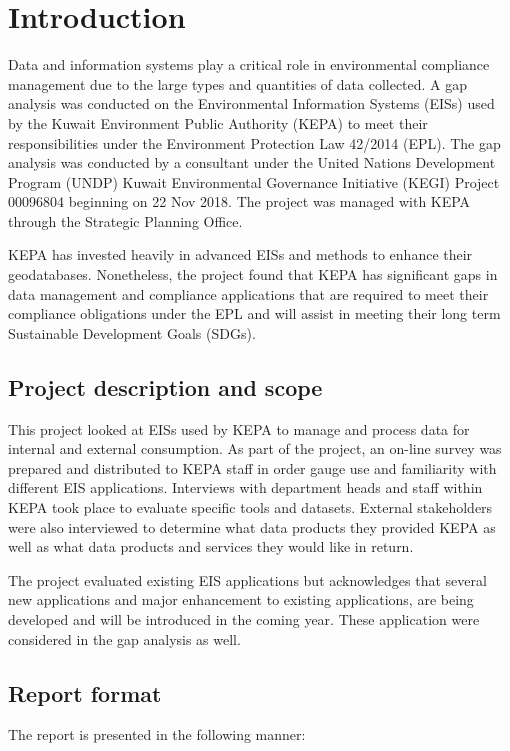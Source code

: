 \chapter{Introduction} 

Data and information systems play a critical role in environmental compliance management due to the large types and quantities of data collected. A gap analysis was conducted on the Environmental Information Systems (EISs) used by the Kuwait Environment Public Authority (KEPA) to meet their responsibilities under the Environment Protection Law 42/2014 (EPL). The gap analysis was conducted by a consultant under the United Nations Development Program (UNDP) Kuwait Environmental Governance Initiative (KEGI) Project 00096804 beginning on 22 Nov 2018. The project was managed with KEPA through the Strategic Planning Office.

KEPA has invested heavily in advanced EISs and methods to enhance their geodatabases. Nonetheless, the project found that KEPA has significant gaps in data management and compliance applications that are required to meet their compliance obligations under the EPL and will assist in meeting their long term Sustainable Development Goals (SDGs).

\section{Project description and scope}

This project looked at EISs used by KEPA to manage and process data for internal and external consumption. As part of the project, an on-line survey was prepared and distributed to KEPA staff in order gauge use and familiarity with different EIS applications. Interviews with department heads and staff within KEPA took place to evaluate specific tools and datasets. External stakeholders were also interviewed to determine what data products they provided KEPA as well as what data products and services they would like in return.

The project evaluated existing EIS applications but acknowledges that several new applications and major enhancement to existing applications, are being developed and will be introduced in the coming year. These application were considered in the gap analysis as well.


\section{Report format}
The report is presented in the following manner:

